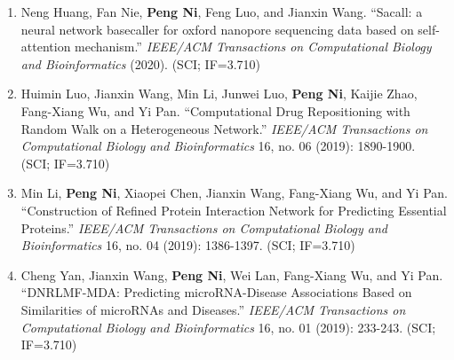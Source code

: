 \documentclass{resume}
\begin{document}
\begin{itemize}
\begin{enumerate}
    \item Neng Huang, Fan Nie, \textbf{Peng Ni}, Feng Luo, and Jianxin Wang. \enquote{Sacall: a neural network basecaller for oxford nanopore sequencing data based on self-attention mechanism.} {\it IEEE/ACM Transactions on Computational Biology and Bioinformatics} (2020). (SCI; IF=3.710)
    \item Huimin Luo, Jianxin Wang, Min Li, Junwei Luo, \textbf{Peng Ni}, Kaijie Zhao, Fang-Xiang Wu, and Yi Pan. \enquote{Computational Drug Repositioning with Random Walk on a Heterogeneous Network.} {\it IEEE/ACM Transactions on Computational Biology and Bioinformatics} 16, no. 06 (2019): 1890-1900. (SCI; IF=3.710)
    \item Min Li, \textbf{Peng Ni}, Xiaopei Chen, Jianxin Wang, Fang-Xiang Wu, and Yi Pan. \enquote{Construction of Refined Protein Interaction Network for Predicting Essential Proteins.} {\it IEEE/ACM Transactions on Computational Biology and Bioinformatics} 16, no. 04 (2019): 1386-1397. (SCI; IF=3.710)
    \item Cheng Yan, Jianxin Wang, \textbf{Peng Ni}, Wei Lan, Fang-Xiang Wu, and Yi Pan. \enquote{DNRLMF-MDA: Predicting microRNA-Disease Associations Based on Similarities of microRNAs and Diseases.} {\it IEEE/ACM Transactions on Computational Biology and Bioinformatics} 16, no. 01 (2019): 233-243. (SCI; IF=3.710)
  \end{enumerate}
\end{itemize}
\end{document}
